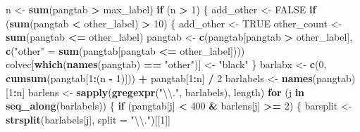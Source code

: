 \documentclass[
]{article}
\newenvironment{Shaded}{\begin{snugshade}}{\end{snugshade}}
\newcommand{\CharTok}[1]{\textcolor[rgb]{0.31,0.60,0.02}{#1}}
\newcommand{\ControlFlowTok}[1]{\textcolor[rgb]{0.13,0.29,0.53}{\textbf{#1}}}
\newcommand{\DataTypeTok}[1]{\textcolor[rgb]{0.13,0.29,0.53}{#1}}
\newcommand{\DecValTok}[1]{\textcolor[rgb]{0.00,0.00,0.81}{#1}}
\newcommand{\KeywordTok}[1]{\textcolor[rgb]{0.13,0.29,0.53}{\textbf{#1}}}
\newcommand{\NormalTok}[1]{#1}
\newcommand{\OperatorTok}[1]{\textcolor[rgb]{0.81,0.36,0.00}{\textbf{#1}}}
\newcommand{\OtherTok}[1]{\textcolor[rgb]{0.56,0.35,0.01}{#1}}
\newcommand{\StringTok}[1]{\textcolor[rgb]{0.31,0.60,0.02}{#1}}
\begin{document}
\begin{Shaded}
\begin{Highlighting}[]
\NormalTok{    n \textless{}{-}}\StringTok{ }\KeywordTok{sum}\NormalTok{(pangtab }\OperatorTok{\textgreater{}}\StringTok{ }\NormalTok{max\_label)}
    \ControlFlowTok{if}\NormalTok{ (n }\OperatorTok{\textgreater{}}\StringTok{ }\DecValTok{1}\NormalTok{) \{}
\NormalTok{        add\_other \textless{}{-}}\StringTok{ }\OtherTok{FALSE}
        \ControlFlowTok{if}\NormalTok{ (}\KeywordTok{sum}\NormalTok{(pangtab }\OperatorTok{\textless{}}\StringTok{ }\NormalTok{other\_label) }\OperatorTok{\textgreater{}}\StringTok{ }\DecValTok{10}\NormalTok{) \{}
\NormalTok{            add\_other \textless{}{-}}\StringTok{ }\OtherTok{TRUE}
\NormalTok{            other\_count \textless{}{-}}\StringTok{ }\KeywordTok{sum}\NormalTok{(pangtab }\OperatorTok{\textless{}=}\StringTok{ }\NormalTok{other\_label)}
\NormalTok{            pangtab \textless{}{-}}\StringTok{ }\KeywordTok{c}\NormalTok{(pangtab[pangtab }\OperatorTok{\textgreater{}}\StringTok{ }\NormalTok{other\_label],}
                \KeywordTok{c}\NormalTok{(}\StringTok{"other"}\NormalTok{ =}\StringTok{ }\KeywordTok{sum}\NormalTok{(pangtab[pangtab }\OperatorTok{\textless{}=}\StringTok{ }\NormalTok{other\_label])))}
\NormalTok{            colvec[}\KeywordTok{which}\NormalTok{(}\KeywordTok{names}\NormalTok{(pangtab) }\OperatorTok{==}\StringTok{ "other"}\NormalTok{)] \textless{}{-}}\StringTok{ "black"}
\NormalTok{        \}}
\NormalTok{        barlabx \textless{}{-}}\StringTok{ }\KeywordTok{c}\NormalTok{(}\DecValTok{0}\NormalTok{, }\KeywordTok{cumsum}\NormalTok{(pangtab[}\DecValTok{1}\OperatorTok{:}\NormalTok{(n }\OperatorTok{{-}}\StringTok{ }\DecValTok{1}\NormalTok{)])) }\OperatorTok{+}
\StringTok{            }\NormalTok{pangtab[}\DecValTok{1}\OperatorTok{:}\NormalTok{n] }\OperatorTok{/}\StringTok{ }\DecValTok{2}
\NormalTok{        barlabels \textless{}{-}}\StringTok{ }\KeywordTok{names}\NormalTok{(pangtab)[}\DecValTok{1}\OperatorTok{:}\NormalTok{n]}
\NormalTok{        barlens \textless{}{-}}\StringTok{ }\KeywordTok{sapply}\NormalTok{(}\KeywordTok{gregexpr}\NormalTok{(}\StringTok{"}\CharTok{\textbackslash{}\textbackslash{}}\StringTok{."}\NormalTok{, barlabels), length)}
        \ControlFlowTok{for}\NormalTok{ (j }\ControlFlowTok{in} \KeywordTok{seq\_along}\NormalTok{(barlabels)) \{}
            \ControlFlowTok{if}\NormalTok{ (pangtab[j] }\OperatorTok{\textless{}}\StringTok{ }\DecValTok{400} \OperatorTok{\&}\StringTok{ }\NormalTok{barlens[j] }\OperatorTok{\textgreater{}=}\StringTok{ }\DecValTok{2}\NormalTok{) \{}
\NormalTok{                barsplit \textless{}{-}}\StringTok{ }\KeywordTok{strsplit}\NormalTok{(barlabels[j], }\DataTypeTok{split =} \StringTok{"}\CharTok{\textbackslash{}\textbackslash{}}\StringTok{."}\NormalTok{)[[}\DecValTok{1}\NormalTok{]]}

\end{Highlighting}
\end{Shaded}
\end{document}
